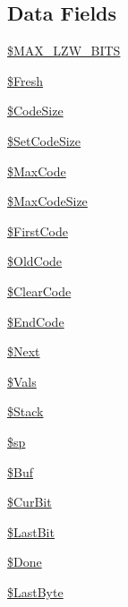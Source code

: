 \subsection*{\-Data \-Fields}
\begin{DoxyCompactItemize}
\item 
\hyperlink{class_c_g_i_f_l_z_w_a881d5405e02095f174faf98b497022fc}{\$\-M\-A\-X\-\_\-\-L\-Z\-W\-\_\-\-B\-I\-T\-S}
\item 
\hyperlink{class_c_g_i_f_l_z_w_a620c521e6daef6a87b72e2816ba809fa}{\$\-Fresh}
\item 
\hyperlink{class_c_g_i_f_l_z_w_a1dab473004b0c5e0c23f4062f6564e2c}{\$\-Code\-Size}
\item 
\hyperlink{class_c_g_i_f_l_z_w_aa75321356d6efcba0ab0efb8359f6956}{\$\-Set\-Code\-Size}
\item 
\hyperlink{class_c_g_i_f_l_z_w_a474cbbba5a21c60ad740f1ac22b74875}{\$\-Max\-Code}
\item 
\hyperlink{class_c_g_i_f_l_z_w_ae66010f0834a599faa1be34f17a0a736}{\$\-Max\-Code\-Size}
\item 
\hyperlink{class_c_g_i_f_l_z_w_a41cf783b0e7dcbb54e0fbcbf162817db}{\$\-First\-Code}
\item 
\hyperlink{class_c_g_i_f_l_z_w_aea43fbe54b0fc542d1779e224c924059}{\$\-Old\-Code}
\item 
\hyperlink{class_c_g_i_f_l_z_w_aa60a54399281ea06e41d5e5b31c67b10}{\$\-Clear\-Code}
\item 
\hyperlink{class_c_g_i_f_l_z_w_af4668432a1df8ba9875cee1f4b32359d}{\$\-End\-Code}
\item 
\hyperlink{class_c_g_i_f_l_z_w_a49b04707c85d624de6900e2691e9c8d1}{\$\-Next}
\item 
\hyperlink{class_c_g_i_f_l_z_w_af5465bb9c32cba44ec0e1125fd64c5de}{\$\-Vals}
\item 
\hyperlink{class_c_g_i_f_l_z_w_a0750a39f339d1c04fa8974737eebbd49}{\$\-Stack}
\item 
\hyperlink{class_c_g_i_f_l_z_w_a0a4d69189b5c6ce87f2739cd82ead174}{\$sp}
\item 
\hyperlink{class_c_g_i_f_l_z_w_ac277f177d33aa72d96f815d666102c2d}{\$\-Buf}
\item 
\hyperlink{class_c_g_i_f_l_z_w_a58d4a0652a9b7a6711ca225d5cb69148}{\$\-Cur\-Bit}
\item 
\hyperlink{class_c_g_i_f_l_z_w_a88ba4821aecd26b957e9c3217cba7392}{\$\-Last\-Bit}
\item 
\hyperlink{class_c_g_i_f_l_z_w_ac34b357749c164306da31f8d8cf04864}{\$\-Done}
\item 
\hyperlink{class_c_g_i_f_l_z_w_af76dc867120a1e953942179dd45b877f}{\$\-Last\-Byte}
\end{DoxyCompactItemize}


